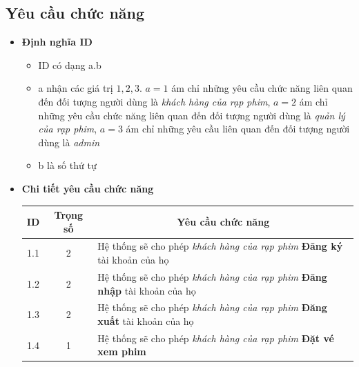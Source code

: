 \documentclass[a4paper, 12pt]{article}
\begin{document}
    \subsection{Yêu cầu chức năng}
    \begin{itemize}
        \item \textbf{Định nghĩa ID}
        \begin{itemize}
            \item ID có dạng a.b
            \item a nhận các giá trị $1, 2, 3$. $a = 1$ ám chỉ những yêu cầu chức năng liên quan đến đối tượng người dùng là \textit{khách hàng của rạp phim}, $a = 2$ ám chỉ những yêu cầu chức năng liên quan đến đối tượng người dùng là \textit{quản lý của rạp phim}, $a = 3$ ám chỉ những yêu cầu liên quan đến đối tượng người dùng là \textit{admin}
            \item b là số thứ tự
        \end{itemize}

        \item \textbf{Chi tiết yêu cầu chức năng}
        \begin{table}[h]
            \begin{tabular}{|c|c|l|}
            \hline
            ID  & Trọng số  & \multicolumn{1}{c|}{Yêu cầu chức năng}                                                                                                          \\ \hline
            1.1 &     2     & Hệ thống sẽ cho phép \textit{khách hàng của rạp phim} \textbf{Đăng ký} tài khoản của họ     \\ \hline
            1.2 &     2     & Hệ thống sẽ cho phép \textit{khách hàng của rạp phim} \textbf{Đăng nhập} tài khoản của họ     \\ \hline
            1.3 &     2     & Hệ thống sẽ cho phép \textit{khách hàng của rạp phim} \textbf{Đăng xuất} tài khoản của họ     \\ \hline
            1.4 &     1     & Hệ thống sẽ cho phép \textit{khách hàng của rạp phim} \textbf{Đặt vé xem phim} \\ \hline


\end{tabular}
\end{table}
\end{itemize}
\end{document}
